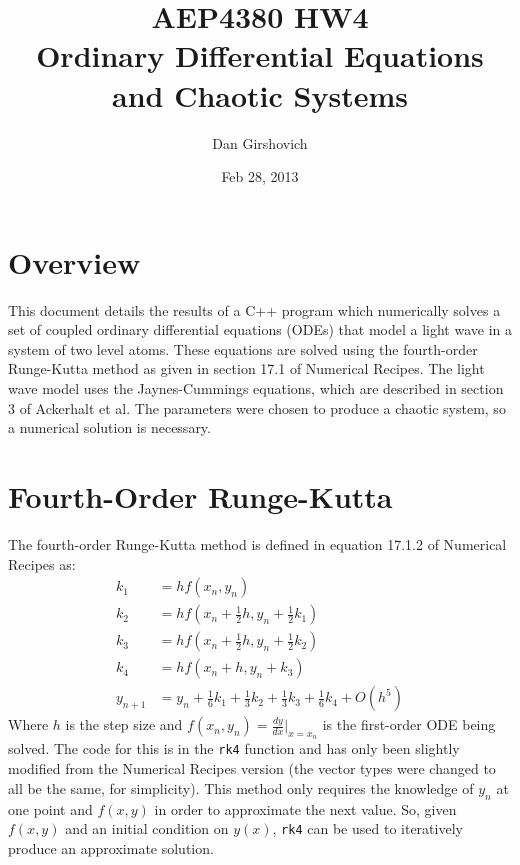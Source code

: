 \documentclass[12pt]{article}
\title{AEP4380 HW4 \\ Ordinary Differential Equations and Chaotic Systems}
\author{Dan Girshovich}
\date{Feb 28, 2013}
\begin{document}
\maketitle

\section{Overview}
This document details the results of a C++ program which numerically solves a set of coupled ordinary differential equations (ODEs) that model a light wave in a system of two level atoms. These equations are solved using the fourth-order Runge-Kutta method as given in section 17.1 of Numerical Recipes\cite{numericalrecipes}. The light wave model uses the Jaynes-Cummings equations, which are described in section 3 of Ackerhalt\cite{ackerhalt} et al. The parameters were chosen to produce a chaotic system, so a numerical solution is necessary.
\section{Fourth-Order Runge-Kutta}
The fourth-order Runge-Kutta method is defined in equation 17.1.2 of Numerical Recipes\cite{numericalrecipes} as:
\begin{align*}
k_1 &= hf(x_n, y_n) \\
k_2 &= hf(x_n + \frac{1}{2}h, y_n + \frac{1}{2}k_1) \\
k_3 &= hf(x_n + \frac{1}{2}h, y_n + \frac{1}{2}k_2) \\
k_4 &= hf(x_n + h, y_n + k_3) \\
y_{n+1} &= y_n + \frac{1}{6}k_1 + \frac{1}{3}k_2 + \frac{1}{3}k_3 + \frac{1}{6}k_4 + O(h^5)
\end{align*}
Where $h$ is the step size and $f(x_n, y_n) = \frac{dy}{dx}|_{x=x_n}$ is the first-order ODE being solved. The code for this is in the \texttt{rk4} function and has only been slightly modified from the Numerical Recipes version (the vector types were changed to all be the same, for simplicity). This method only requires the knowledge of $y_n$ at one point and $f(x,y)$ in order to approximate the next value. So, given $f(x,y)$ and an initial condition on $y(x)$, \texttt{rk4} can be used to iteratively produce an approximate solution.
\end{document}
